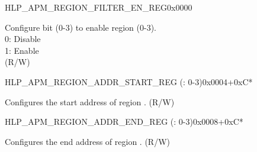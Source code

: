\begin{register}{H}{LP\_APM\_REGION\_FILTER\_EN\_REG}{0x0000}\label{regdesc:LPAPMREGIONFILTERENREG}
%
%
\regnewline%
\begin{regdesc}\begin{reglist}
\label{fielddesc:LPAPMREGIONFILTEREN}\item [LP\_APM\_REGION\_FILTER\_EN] Configure bit  (0-3) to enable region  (0-3).\\ 
0: Disable \\ 
1: Enable  \\ (R/W)
\end{reglist}\end{regdesc}
\end{register}


\begin{register}{H}{LP\_APM\_REGION\_ADDR\_START\_REG (: 0-3)}{0x0004+0xC*}\label{regdesc:LPAPMREGION0ADDRSTARTREG}
%
\regnewline%
\begin{regdesc}\begin{reglist}
\label{fielddesc:LPAPMREGION0ADDRSTART}\item [LP\_APM\_REGION\regindex{n}\_ADDR\_START] Configures the start address of region . (R/W)
\end{reglist}\end{regdesc}
\end{register}


\begin{register}{H}{LP\_APM\_REGION\_ADDR\_END\_REG (: 0-3)}{0x0008+0xC*} \label{regdesc:LPAPMREGION0ADDRENDREG}
%
\regnewline%
\begin{regdesc}\begin{reglist}
\label{fielddesc:LPAPMREGION0ADDREND}\item [LP\_APM\_REGION\regindex{n}\_ADDR\_END] Configures the end address of region . (R/W)
\end{reglist}\end{regdesc}
\end{register}
















